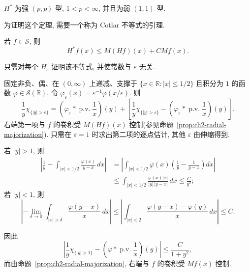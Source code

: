 \begin{Theorem}
\label{thm:ch3-maximal-hilbert-bounds}
$H^*$ 为强 $(p,p)$ 型, $1<p<\infty$, 并且为弱 $(1,1)$ 型.
\end{Theorem}

为证明这个定理, 需要一个称为 Cotlar 不等式的引理.

\begin{Lemma}
\label{lem:ch3-cotlar-inequality}
若 $f\in\mathcal S$, 则
\[
 H^*f(x)\le M(Hf)(x)+CMf(x).
\]
\end{Lemma}

\begin{Proof}
只需对每个 $H_\varepsilon$ 证明该不等式, 并使常数与 $\varepsilon$ 无关.

固定非负、偶、在 $(0,\infty)$ 上递减、支撑于 $\{x\in\mathbb R:|x|\le1/2\}$ 且积分为 $1$ 的函数 $\varphi\in\mathcal S(\mathbb R)$. 令 $\varphi_\varepsilon(x)=\varepsilon^{-1}\varphi(x/\varepsilon)$. 则
\[
 \frac1y\chi_{\{|y|>\varepsilon\}}
 =\left(\varphi_\varepsilon*\operatorname{p.v.}\frac1x\right)(y)
 +\left[
 \frac1y\chi_{\{|y|>\varepsilon\}}
 -\left(\varphi_\varepsilon*\operatorname{p.v.}\frac1x\right)(y)
 \right].
\]
右端第一项与 $f$ 的卷积受 $M(Hf)(x)$ 控制(参见命题~\ref{prop:ch2-radial-majorization}). 只需在 $\varepsilon=1$ 时求出第二项的逐点估计, 其他 $\varepsilon$ 由伸缩得到.

若 $|y|>1$, 则
\[
\begin{aligned}
 \left|\frac1y-\int_{|x|<1/2}\frac{\varphi(x)}{y-x}\,dx\right|
 &=\left|\int_{|x|<1/2}\varphi(x)
 \left(\frac1y-\frac1{y-x}\right)dx\right|\\
 &\le\int_{|x|<1/2}\frac{\varphi(x)|x|}{|y|\,|y-x|}\,dx
 \le\frac C{y^2};
\end{aligned}
\]
若 $|y|<1$, 则
\[
 \left|-\lim_{\delta\to0}\int_{|x|>\delta}\frac{\varphi(y-x)}x\,dx\right|
 \le\left|\int_{|x|<2}\frac{\varphi(y-x)-\varphi(y)}x\,dx\right|
 \le C.
\]

\hypertarget{chapter-03-page-069}{}
因此
\[
 \left|\frac1y\chi_{\{|y|>1\}}
 -\left(\varphi*\operatorname{p.v.}\frac1x\right)(y)\right|
 \le\frac C{1+y^2},
\]
而由命题~\ref{prop:ch2-radial-majorization}, 右端与 $f$ 的卷积受 $Mf(x)$ 控制.
\end{Proof}

